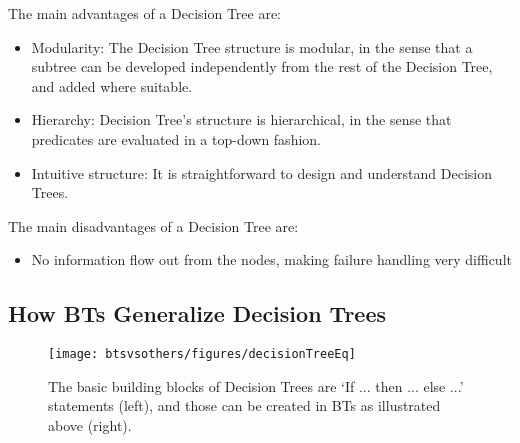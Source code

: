 The main advantages of a Decision Tree are:
\begin{itemize}
\item Modularity: The Decision Tree structure is modular, in the sense that a subtree can be developed independently from the rest of the Decision Tree, and added where suitable.
\item Hierarchy: Decision Tree's structure is hierarchical, in the sense that predicates are evaluated in a top-down fashion.
\item Intuitive structure: It is straightforward to design and understand Decision Trees.
\end{itemize}
The main disadvantages of a Decision Tree are:
\begin{itemize}
\item No information flow out from the nodes, making failure handling very difficult

\end{itemize}

\subsection{How BTs Generalize Decision Trees}
\label{sec:BT_generalize_DT}

\begin{figure}[htbp]
\begin{center}
\texttt{[image: btsvsothers/figures/decisionTreeEq]}
\caption{The basic building blocks of Decision Trees are `If ... then ... else ...' statements (left), and those can be created in BTs as illustrated above (right). }
\label{btsvsothers:fig:decisionTreeEq_v2}
\end{center}
\end{figure}






